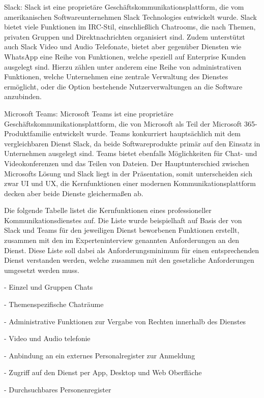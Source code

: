 Slack: Slack ist eine proprietäre Geschäftskommunikationsplattform, die vom amerikanischen Softwareunternehmen Slack Technologies entwickelt wurde. Slack bietet viele Funktionen im IRC-Stil, einschließlich Chatrooms, die nach Themen, privaten Gruppen und Direktnachrichten organisiert sind. Zudem unterstützt auch Slack Video und Audio Telefonate, bietet aber gegenüber Diensten wie WhatsApp eine Reihe von Funktionen, welche speziell auf Enterprise Kunden ausgelegt sind. Hierzu zählen unter anderem eine Reihe von administrativen Funktionen, welche Unternehmen eine zentrale Verwaltung des Dienstes ermöglicht, oder die Option bestehende Nutzerverwaltungen an die Software anzubinden.

Microsoft Teams: Microsoft Teams ist eine proprietäre Geschäftskommunikationsplattform, die von Microsoft als Teil der Microsoft 365-Produktfamilie entwickelt wurde. Teams konkurriert hauptsächlich mit dem vergleichbaren Dienst Slack, da beide Softwareprodukte primär auf den Einsatz in Unternehmen ausgelegt sind. Teams bietet ebenfalls Möglichkeiten für Chat- und Videokonferenzen und das Teilen von Dateien. Der Hauptunterschied zwischen Microsofts Lösung und Slack liegt in der Präsentation, somit unterscheiden sich zwar UI und UX, die Kernfunktionen einer modernen Kommunikationsplattform decken aber beide Dienste gleichermaßen ab.

Die folgende Tabelle listet die Kernfunktionen eines professioneller Kommunikationsdienstes auf. Die Liste wurde beispielhaft auf Basis der von Slack und Teams für den jeweiligen Dienst beworbenen Funktionen erstellt, zusammen mit den im Experteninterview genannten Anforderungen an den Dienst. Diese Liste soll dabei als Anforderungsminimum für einen entsprechenden Dienst verstanden werden, welche zusammen mit den gesetzliche Anforderungen umgesetzt werden muss.

- Einzel und Gruppen Chats 

- Themenspezifische Chaträume

- Administrative Funktionen zur Vergabe von Rechten innerhalb des Dienstes 

- Video und Audio telefonie

- Anbindung an ein externes Personalregister zur Anmeldung

- Zugriff auf den Dienst per App, Desktop und Web Oberfläche

- Durchsuchbares Personenregister